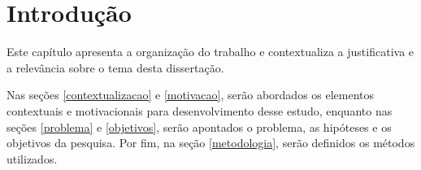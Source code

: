 \chapter{Introdução}
\label{chap:intro}

Este capítulo apresenta a organização do trabalho e contextualiza a justificativa e a relevância sobre o tema desta dissertação. 

 

Nas seções \ref{contextualizacao} e \ref{motivacao}, serão abordados os elementos contextuais e motivacionais para desenvolvimento desse estudo, enquanto nas seções \ref{problema} e \ref{objetivos}, serão apontados o problema, as hipóteses e os objetivos da pesquisa. Por fim, na seção \ref{metodologia}, serão definidos os métodos utilizados.


 

 
  
  
 
 
      
 
 
% 
 
% 

%

%

%  
